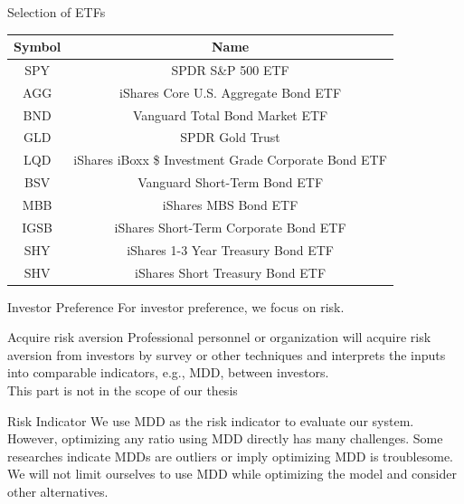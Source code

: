 \begin{frame}{Selection of ETFs}
    \begin{tabular}{|| c | c ||}
    \hline
    Symbol & Name  \\ \hline \hline
    SPY&SPDR S\&P 500 ETF \\ \hline
    AGG&iShares Core U.S. Aggregate Bond ETF \\ \hline
    BND&Vanguard Total Bond Market ETF \\ \hline
    GLD&SPDR Gold Trust \\ \hline
    LQD&iShares iBoxx \$ Investment Grade Corporate Bond ETF \\ \hline
    BSV&Vanguard Short-Term Bond ETF \\ \hline
    MBB&iShares MBS Bond ETF \\ \hline
    IGSB&iShares Short-Term Corporate Bond ETF \\ \hline
    SHY&iShares 1-3 Year Treasury Bond ETF \\ \hline
    SHV&iShares Short Treasury Bond ETF \\ \hline
    \end{tabular}
\end{frame}



\begin{frame}{Investor Preference}
For investor preference, we focus on risk.
\begin{block}{Acquire risk aversion}
Professional personnel or organization will acquire risk aversion from investors by survey or other techniques and interprets the inputs into comparable indicators, e.g., MDD, between investors.
\\
\alert{This part is not in the scope of our thesis}
\end{block}
\begin{block}{Risk Indicator}
We use MDD as the risk indicator to evaluate our system. However, optimizing any ratio using MDD directly has many challenges. Some researches indicate MDDs are outliers or imply optimizing MDD is troublesome. 
\\
\alert{We will not limit ourselves to use MDD while optimizing the model and consider other alternatives.}
\end{block}
\end{frame}






